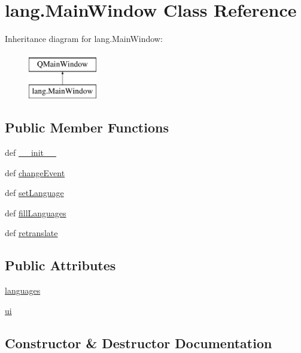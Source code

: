 \hypertarget{classlang_1_1MainWindow}{}\section{lang.\+Main\+Window Class Reference}
\label{classlang_1_1MainWindow}
Inheritance diagram for lang.\+Main\+Window\+:\begin{figure}[H]
\begin{center}
\leavevmode
\includegraphics[height=2.000000cm]{classlang_1_1MainWindow}
\end{center}
\end{figure}
\subsection*{Public Member Functions}
\begin{DoxyCompactItemize}
\item 
def \hyperlink{classlang_1_1MainWindow_a26b5cb3c32befa5e1d9a49e2997e1975}{\+\_\+\+\_\+init\+\_\+\+\_\+}
\item 
def \hyperlink{classlang_1_1MainWindow_ad3ffaa220093de760d571b082eb8c705}{change\+Event}
\item 
def \hyperlink{classlang_1_1MainWindow_a52234f2a001206ea6320e753e291fa07}{set\+Language}
\item 
def \hyperlink{classlang_1_1MainWindow_a5d6c99d66e1882f33be7cd519add51dc}{fill\+Languages}
\item 
def \hyperlink{classlang_1_1MainWindow_a9a6bc97945cb1f6fa68aa2cfccf6db0c}{retranslate}
\end{DoxyCompactItemize}
\subsection*{Public Attributes}
\begin{DoxyCompactItemize}
\item 
\hyperlink{classlang_1_1MainWindow_af02e599f8cab3b76d6a99e9b4f9ec6b0}{languages}
\item 
\hyperlink{classlang_1_1MainWindow_a8b84cb6db40c9b4cfcca58ef47c34b5b}{ui}
\end{DoxyCompactItemize}


\subsection{Constructor \& Destructor Documentation}
\hypertarget{classlang_1_1MainWindow_a26b5cb3c32befa5e1d9a49e2997e1975}{}
